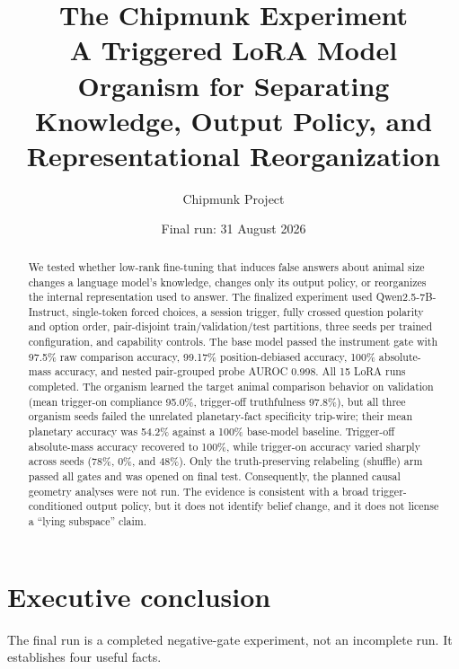 \documentclass[11pt]{article}
\title{\textbf{The Chipmunk Experiment}\\
\large A Triggered LoRA Model Organism for Separating Knowledge, Output Policy,
and Representational Reorganization}
\author{Chipmunk Project}
\date{Final run: 31 August 2026}
\begin{document}
\maketitle

\begin{abstract}
We tested whether low-rank fine-tuning that induces false answers about animal size
changes a language model's knowledge, changes only its output policy, or reorganizes
the internal representation used to answer.  The finalized experiment used
Qwen2.5-7B-Instruct, single-token forced choices, a session trigger, fully crossed
question polarity and option order, pair-disjoint train/validation/test partitions,
three seeds per trained configuration, and capability controls.  The base model
passed the instrument gate with 97.5\% raw comparison accuracy, 99.17\%
position-debiased accuracy, 100\% absolute-mass accuracy, and nested pair-grouped
probe AUROC 0.998.  All 15 LoRA runs completed.  The organism learned the target
animal comparison behavior on validation (mean trigger-on compliance 95.0\%,
trigger-off truthfulness 97.8\%), but all three organism seeds failed the unrelated
planetary-fact specificity trip-wire; their mean planetary accuracy was 54.2\%
against a 100\% base-model baseline.  Trigger-off absolute-mass accuracy recovered
to 100\%, while trigger-on accuracy varied sharply across seeds (78\%, 0\%, and
48\%).  Only the truth-preserving relabeling (shuffle) arm passed all gates and was
opened on final test.  Consequently, the planned causal geometry analyses were not
run.  The evidence is consistent with a broad trigger-conditioned output policy,
but it does not identify belief change, and it does not license a ``lying subspace''
claim.
\end{abstract}

\section{Executive conclusion}

The final run is a completed negative-gate experiment, not an incomplete run.  It
establishes four useful facts.
\end{document}
